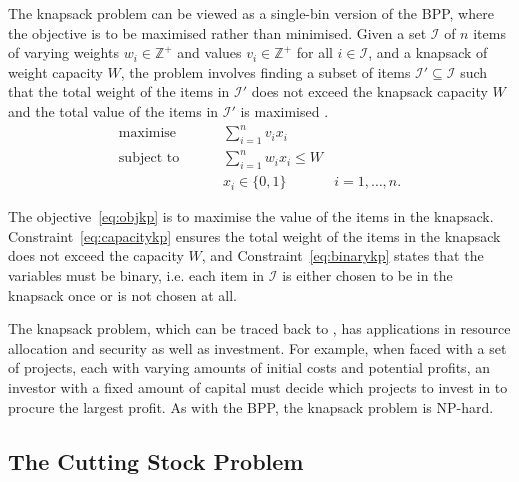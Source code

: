 \documentclass[a4paper,11pt]{article}
\begin{document}
\noindent The knapsack problem can be viewed as a single-bin version of the BPP, where the objective is to be maximised rather than minimised. Given a set $\mathcal{I}$ of $n$ items of varying weights $w_i \in \mathbb{Z}^+$ and values $v_i \in \mathbb{Z}^+$ for all $i \in \mathcal{I}$, and a knapsack of weight capacity $W$, the problem involves finding a subset of items $\mathcal{I}' \subseteq \mathcal{I}$ such that the total weight of the items in $\mathcal{I}'$ does not exceed the knapsack capacity $W$ and the total value of the items in $\mathcal{I}'$ is maximised \citep{martello1990k}.
\begin{subequations}
	\begin{align}
	\text{maximise  } &\qquad \sum_{i=1}^n v_i x_i & \label{eq:objkp} \\[3pt]
	\text{subject to  } &\qquad \sum_{i=1}^n w_i x_i \leq W & \label{eq:capacitykp} \\[3pt]
	&\qquad x_i \in \{0,1\} & i = 1,\dotsc,n. \label{eq:binarykp}
	\end{align}
\end{subequations}

\noindent The objective~\eqref{eq:objkp} is to maximise the value of the items in the knapsack. Constraint~\eqref{eq:capacitykp} ensures the total weight of the items in the knapsack does not exceed the capacity $W$, and Constraint~\eqref{eq:binarykp} states that the variables must be binary, i.e. each item in $\mathcal{I}$ is either chosen to be in the knapsack once or is not chosen at all.

The knapsack problem, which can be traced back to \citet{mathews1896}, has applications in resource allocation and security as well as investment. For example, when faced with a set of projects, each with varying amounts of initial costs and potential profits, an investor with a fixed amount of capital must decide which projects to invest in to procure the largest profit. As with the BPP, the knapsack problem is NP-hard.


\subsection{The Cutting Stock Problem}
\label{sub:csp}
\end{document}
